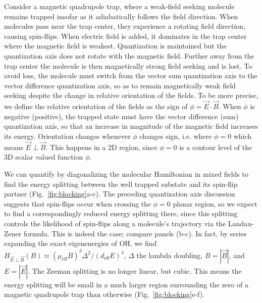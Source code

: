\documentclass[%
 reprint,
 amsmath,amssymb,
 aps,
prl,
]{revtex4-1}
\newcommand{\epb}{{$\vec{E}\!\perp\!\vec{B}$}}
\newcommand{\epbm}{{\vec{E}\!\perp\!\vec{B}}}
\begin{document}
Consider a magnetic quadrupole trap, where a weak-field seeking molecule remains trapped insofar as it adiabatically follows the field direction. 
When molecules pass near the trap center, they experience a rotating field direction, causing spin-flips. 
When electric field is added, it dominates in the trap center where the magnetic field is weakest. 
Quantization is maintained but the quantization axis does not rotate with the magnetic field. 
Further away from the trap center the molecule is then magnetically strong field seeking and is lost. 
To avoid loss, the molecule must switch from the vector sum quantization axis to the vector difference quantization axis, so as to remain magnetically weak field seeking despite the change in relative orientation of the fields. 
To be more precise, we define the relative orientation of the fields as the sign of $\phi=\vec{E}\cdot\vec{B}$. 
When $\phi$ is negative (positive), the trapped state must have the vector difference (sum) quantization axis, so that an increase in magnitude of the magnetic field increases its energy. 
Orientation changes whenever $\phi$ changes sign, i.e. where $\phi=0$ which means \epb. 
This happens in a 2D region, since $\phi=0$ is a contour level of the 3D scalar valued function $\phi$. 

We can quantify by diagonalizing the molecular Hamiltonian in mixed fields to find the energy splitting between the well trapped substate and its spin-flip partner (Fig.~\ref{fig:blocking}a-c). 
The preceding quantization axis discussion suggests that spin-flips occur when crossing the $\phi=0$ planar region, so we expect to find a correspondingly reduced energy splitting there, since this splitting controls the likelihood of spin-flips along a molecule's trajectory via the Landau-Zener formula. 
This is indeed the case; compare panels (b-c). In fact, by series expanding the exact eigenenergies of OH, we find $H_\epbm(B)\approx (\mu_\text{eff}B)^3\Delta^2/(d_\text{eff}E)^4$, $\Delta$ the lambda doubling, $B=|\vec{B}|$, and $E=|\vec{E}|$. 
The Zeeman splitting is no longer linear, but cubic. 
This means the energy splitting will be small in a much larger region surrounding the zero of a magnetic quadrupole trap than otherwise (Fig.~\ref{fig:blocking}e-f).
\end{document}
